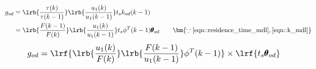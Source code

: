 \begin{align*}
        g_{od} &= \lrb{\frac{\tau(k)}{\tau(k-1)}}
                                \lrb{\frac{u_1(k)}{u_1(k-1)}}
                t_s k_{od}(k-1)\\
                &= \lrb{\frac{F(k-1)}{F(k)}}
                                \lrb{\frac{u_1(k)}{u_1(k-1)}}
                t_s \phi^T(k-1) \pmb \theta_{od}
                \qquad \bm{\because \ref{eqn::residence_time_mdl}, \ref{eqn::k_mdl}}
\end{align*}
\begin{align}
        g_{od} &= \lrf{ \lrb{\frac{u_1(k)}{F(k)}} \lrb{\frac{F(k-1)}{u_1(k-1)}} \phi^T(k-1) }
                \times \lrf{t_s \pmb \theta_{od}}
\end{align}
